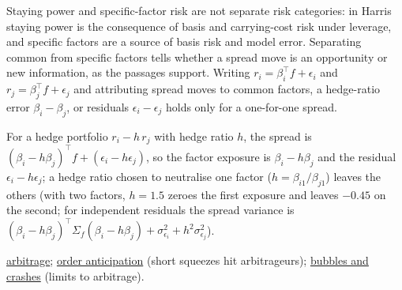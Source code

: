 \begin{qfresult}
 Staying power and specific-factor risk are not separate risk categories: in Harris staying power is the consequence of basis and carrying-cost risk under leverage, and specific factors are a source of basis risk and model error. Separating common from specific factors tells whether a spread move is an opportunity or new information, as the passages support. Writing $r_i=\beta_i^\top f+\epsilon_i$ and $r_j=\beta_j^\top f+\epsilon_j$ and attributing spread moves to common factors, a hedge-ratio error $\beta_i-\beta_j$, or residuals $\epsilon_i-\epsilon_j$ holds only for a one-for-one spread.

For a hedge portfolio $r_i-h\,r_j$ with hedge ratio $h$, the spread is $(\beta_i-h\beta_j)^\top f+(\epsilon_i-h\epsilon_j)$, so the factor exposure is $\beta_i-h\beta_j$ and the residual $\epsilon_i-h\epsilon_j$; a hedge ratio chosen to neutralise one factor ($h=\beta_{i1}/\beta_{j1}$) leaves the others (with two factors, $h=1.5$ zeroes the first exposure and leaves $-0.45$ on the second; for independent residuals the spread variance is $(\beta_i-h\beta_j)^\top\Sigma_f(\beta_i-h\beta_j)+\sigma^2_{\epsilon_i}+h^2\sigma^2_{\epsilon_j}$).

 \hyperref[def:arbitrage]{arbitrage}; \hyperref[def:order-anticipation]{order anticipation} (short squeezes hit arbitrageurs); \hyperref[mech:bubble-crash-dynamics]{bubbles and crashes} (limits to arbitrage).

\end{qfresult}

